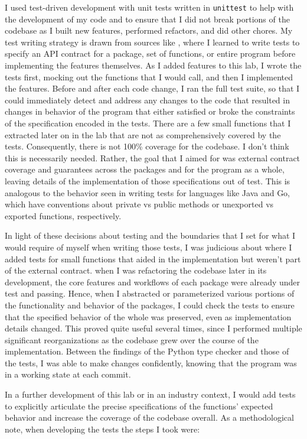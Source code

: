 \documentclass[10pt,letterpaper,final]{report}
\begin{document}
I used test-driven development with unit tests written in \texttt{unittest} to help with the development of my code and to ensure that I did not break portions of the codebase as I built new features, performed refactors, and did other chores. My test writing strategy is drawn from sources like , where I learned to write tests to specify an API contract for a package, set of functions, or entire program before implementing the features themselves. As I added features to this lab, I wrote the tests first, mocking out the functions that I would call, and then I implemented the features. Before and after each code change, I ran the full test suite, so that I could immediately detect and address any changes to the code that resulted in changes in behavior of the program that either satisfied or broke the constraints of the specification encoded in the tests. There are a few small functions that I extracted later on in the lab that are not as comprehensively covered by the tests. Consequently, there is not 100\% coverage for the codebase. I don't think this is necessarily needed. Rather, the goal that I aimed for was external contract coverage and guarantees across the packages and for the program as a whole, leaving details of the implementation of those specifications out of test. This is analogous to the behavior seen in writing tests for languages like Java and Go, which have conventions about private vs public methods or unexported vs exported functions, respectively.

In light of these decisions about testing and the boundaries that I set for what I would require of myself when writing those tests, I was judicious about where I added tests for small functions that aided in the implementation but weren't part of the external contract. when I was refactoring the codebase later in its development, the core features and workflows of each package were already under test and passing. Hence, when I abstracted or parameterized various portions of the functionality and behavior of the packages, I could check the tests to ensure that the specified behavior of the whole was preserved, even as implementation details changed. This proved quite useful several times, since I performed multiple significant reorganizations as the codebase grew over the course of the implementation. Between the findings of the Python type checker and those of the tests, I was able to make changes confidently, knowing that the program was in a working state at each commit.

In a further development of this lab or in an industry context, I would add tests to explicitly articulate the precise specifications of the functions' expected behavior and increase the coverage of the codebase overall. As a methodological note, when developing the tests the steps I took were:
\end{document}
